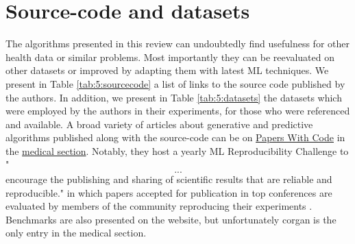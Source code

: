 \section{Source-code and datasets}
The algorithms presented in this review can undoubtedly find usefulness for other health data or similar problems. Most importantly they can be reevaluated on other datasets or improved by adapting them with latest ML techniques. We present in Table \ref{tab:5:sourcecode} a list of links to the source code published by the authors. In addition, we present in Table \ref{tab:5:datasets} the datasets which were employed by the authors in their experiments, for those who were referenced and available. A broad variety of articles about generative and predictive algorithms published along with the source-code can be on \href{https://paperswithcode.com}{Papers With Code} in the \href{https://paperswithcode.com/area/medical}{medical section}. Notably, they host a yearly ML Reproducibility Challenge to "\[...\] encourage the publishing and sharing of scientific results that are reliable and reproducible." in which papers accepted for publication in top conferences are evaluated by members of the community reproducing their experiments \cite{Sinha}. Benchmarks are also presented on the website, but unfortunately \gls{corgan} is the only entry in the medical section. 



